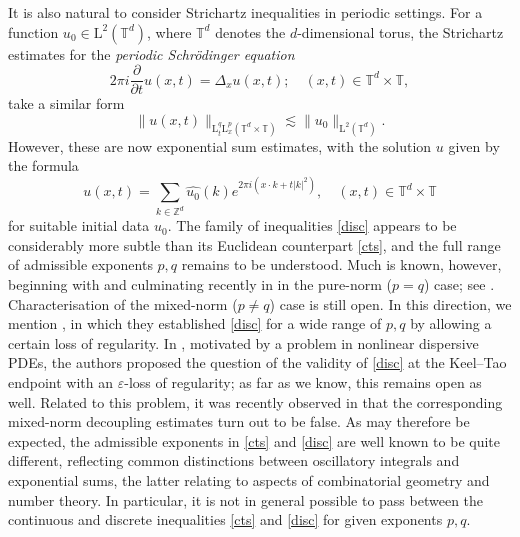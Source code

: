 \documentclass[11pt,reqno]{amsart}
\numberwithin{equation}{section}
\begin{document}
It is also natural to consider Strichartz inequalities in periodic settings. For a function $u_0\in \mathrm{L}^2(\mathbb{T}^d)$, where $\mathbb{T}^d$ denotes the $d$-dimensional torus, the Strichartz estimates for the \textit{periodic Schr\"{o}dinger equation}
\begin{equation*}%
2\pi i\frac{\partial}{\partial t} u(x,t) = \Delta_x u(x,t); \quad (x,t)\in\mathbb{T}^d\times \mathbb{T},
\end{equation*}
take a similar form
\begin{equation}\label{disc}
\|u(x,t)\|_{\mathrm{L}^q_t\mathrm{L}^p_x(\mathbb{T}^d\times\mathbb{T})}\lesssim\|u_0\|_{\mathrm{L}^2(\mathbb{T}^d)}.
\end{equation}
However, these are now exponential sum estimates, with
the solution $u$ given by the formula
\begin{equation}\label{eq:per-solution}
u(x,t)=\sum_{k\in\mathbb{Z}^d}\widehat{u_0}(k)e^{2\pi i(x\cdot k+t|k|^2)},
\quad (x,t)\in\mathbb{T}^d\times\mathbb{T}
\end{equation}
for suitable initial data $u_0$.
The family of inequalities \eqref{disc} appears to be considerably more subtle than its Euclidean counterpart \eqref{cts}, and the full range of admissible exponents $p,q$ remains to be understood.
Much is known, however, beginning with \cite{B1} and culminating recently in \cite{BD} in the pure-norm ($p=q$) case; see \cite{Dem,Nah}.
Characterisation of the mixed-norm ($p\neq q$) case is still open. In this direction, we mention \cite{BGT}, in which they established \eqref{disc} for a wide range of $p,q$ by allowing a certain loss of regularity. In \cite{KNS}, motivated by a problem in nonlinear dispersive PDEs, the authors proposed the question of the validity of \eqref{disc} at the Keel--Tao endpoint with an $\varepsilon$-loss of regularity; as far as we know, this remains open as well.
Related to this problem, it was recently observed in \cite{DJLM} that the corresponding mixed-norm decoupling estimates turn out to be false. 
As may therefore be expected, the admissible exponents in \eqref{cts} and \eqref{disc} are well known to be quite different, reflecting common distinctions between oscillatory integrals and exponential sums, the latter relating to aspects of combinatorial geometry and number theory. In particular, it is not in general possible to pass between the continuous and discrete inequalities \eqref{cts} and \eqref{disc} for given exponents $p,q$. 
\end{document}
